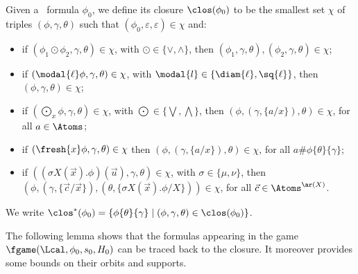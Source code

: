 \begin{definition}\label{def:closFresh}
    Given a \fhml\ formula $\phi_0$, we define its closure $\clos(\phi_0)$ to be the smallest set $\chi$ of triples $(\phi,\gamma,\theta)$ such that $(\phi_0,\varepsilon,\varepsilon) \in \chi$ and:
    \begin{itemize}
        \item if $(\phi_1 \odot \phi_2, \gamma,\theta) \in \chi$, with $\odot\in\{\lor,\land\}$, then $(\phi_1, \gamma,\theta), (\phi_2, \gamma,\theta) \in \chi$;
        \item if $(\modal{\ell}\phi, \gamma,\theta) \in \chi$, with $\modal{l}\in\{\diam{\ell},\sq{\ell}\}$, then $(\phi, \gamma,\theta) \in \chi$;
        \item if $(\bigodot_x\phi, \gamma,\theta) \in \chi$, with $\bigodot\in\{\bigvee,\bigwedge\}$, %
          then $(\phi,(\gamma,\{a/x\}),\theta) \in \chi$, for all $a\in\Atoms$;
        \item if $(\fresh{x}\phi,\gamma, \theta) \in \chi$
          then $(\phi,(\gamma,\{a/x\}), \theta) \in \chi$, for all $a\#\phi\{\theta\}\{\gamma\}$;
        \item if $((\sigma X(\vec x).\phi)(\vec u),\gamma, \theta) \in \chi$, with $\sigma\in\{\mu,\nu\}$, then $(\phi,(\gamma,\{\vec c/\vec x\}), (\theta,\{\sigma X(\vec x).\phi / X\}))\in\chi$, for all $\vec c \in \Atoms^{\ar(X)}$.
    \end{itemize}
    We write $\clos^*(\phi_0) = \{\phi\{\theta\}\{\gamma\}\mid (\phi,\gamma, \theta) \in \clos(\phi_0)\}$.
\end{definition}

The following lemma shows that the formulas appearing in the game $\fgame(\Lcal,\phi_0, s_0,H_0)$ can be traced back to the closure. It moreover provides some bounds on their orbits and supports. 

